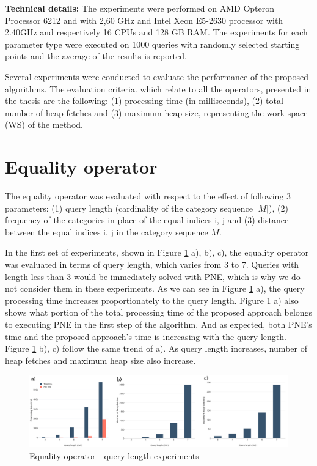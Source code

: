 \textbf{Technical details:}
The experiments were performed on AMD Opteron Processor 6212 and with 2,60 GHz and Intel Xeon E5-2630 processor with 2.40GHz and respectively 16 CPUs and 128 GB RAM. The experiments for each parameter type were executed on 1000 queries with randomly selected starting points and the average of the results is reported.

Several experiments were conducted to evaluate the performance of the proposed algorithms. The evaluation criteria. which relate to all the operators, presented in the thesis are the following: (1) processing time (in milliseconds), (2) total number of heap fetches and (3) maximum heap size, representing the work space (WS) of the method.

\section{Equality operator}
\label{sec:experimentsEO}

The equality operator was evaluated with respect to the effect of following 3 parameters: (1) query length (cardinality of the category sequence $|M|$), (2) frequency of the categories in place of the equal indices i, j and (3) distance between the equal indices i, j in the category sequence $M$.

In the first set of experiments, shown in Figure \ref{fig:eo_length} a), b), c), the equality operator was evaluated in terms of query length, which varies from 3 to 7. Queries with length less than 3 would be immediately solved with PNE, which is why we do not consider them in these experiments. 
As we can see in Figure \ref{fig:eo_length} a), the query processing time increases proportionately to the query length. Figure \ref{fig:eo_length} a) also shows what portion of the total processing time of the proposed approach belongs to executing PNE in the first step of the algorithm. And as expected, both PNE's time and the proposed approach's time is increasing with the query length.
Figure \ref{fig:eo_length} b), c) follow the same trend of a). As query length increases, number of heap fetches and maximum heap size also increase.

\begin{figure}[H]
	\includegraphics[scale=0.25]{images/eo_length.png}
	\centering
	\caption{Equality operator - query length experiments}
	\label{fig:eo_length}
\end{figure}

